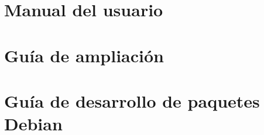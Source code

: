 \documentclass[a4paper,12pt,titlepage,halfparskip,cleardoubleempty]{scrbook}
\begin{document}
\chapter{Manual del usuario}
%
 
\chapter{Guía de ampliación}
%

\appendix

\chapter{Guía de desarrollo de paquetes Debian}
%







\printindex
\end{document}

